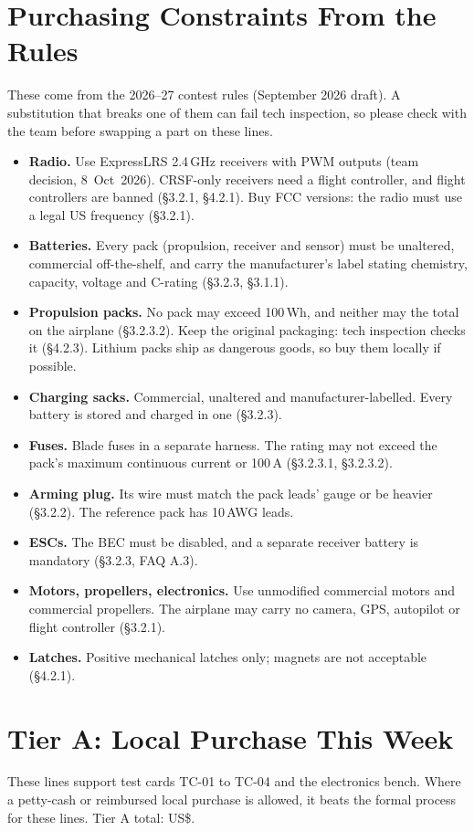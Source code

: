 \documentclass[final]{dbfdoc}
\begin{document}
\onecolumn
\section{Purchasing Constraints From the Rules}
These come from the 2026--27 contest rules (September 2026 draft). A substitution that breaks one of them can fail tech inspection, so please check with the team before swapping a part on these lines.
\begin{itemize}
\item \textbf{Radio.} Use ExpressLRS 2.4\,GHz receivers with PWM outputs (team decision, 8~Oct~2026). CRSF-only receivers need a flight controller, and flight controllers are banned (§3.2.1, §4.2.1). Buy FCC versions: the radio must use a legal US frequency (§3.2.1).
\item \textbf{Batteries.} Every pack (propulsion, receiver and sensor) must be unaltered, commercial off-the-shelf, and carry the manufacturer's label stating chemistry, capacity, voltage and C-rating (§3.2.3, §3.1.1).
\item \textbf{Propulsion packs.} No pack may exceed 100\,Wh, and neither may the total on the airplane (§3.2.3.2). Keep the original packaging: tech inspection checks it (§4.2.3). Lithium packs ship as dangerous goods, so buy them locally if possible.
\item \textbf{Charging sacks.} Commercial, unaltered and manufacturer-labelled. Every battery is stored and charged in one (§3.2.3).
\item \textbf{Fuses.} Blade fuses in a separate harness. The rating may not exceed the pack's maximum continuous current or 100\,A (§3.2.3.1, §3.2.3.2).
\item \textbf{Arming plug.} Its wire must match the pack leads' gauge or be heavier (§3.2.2). The reference pack has 10\,AWG leads.
\item \textbf{ESCs.} The BEC must be disabled, and a separate receiver battery is mandatory (§3.2.3, FAQ A.3).
\item \textbf{Motors, propellers, electronics.} Use unmodified commercial motors and commercial propellers. The airplane may carry no camera, GPS, autopilot or flight controller (§3.2.1).
\item \textbf{Latches.} Positive mechanical latches only; magnets are not acceptable (§4.2.1).
\end{itemize}

\section{Tier A: Local Purchase This Week}
These lines support test cards TC-01 to TC-04 and the electronics bench. Where a petty-cash or reimbursed local purchase is allowed, it beats the formal process for these lines. Tier A total: US\$\prTotalA.

\end{document}
